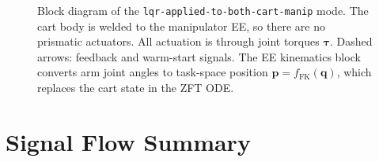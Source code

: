 \documentclass[11pt, a4paper]{article}
\begin{document}
\begin{figure}[H]
{\begin{tikzpicture}
\end{tikzpicture}
}%
\caption{%
  Block diagram of the \texttt{lqr-applied-to-both-cart-manip} mode.
  The cart body is welded to the manipulator EE, so there are no prismatic
  actuators.  All actuation is through joint torques $\bm{\tau}$.
  Dashed arrows: feedback and warm-start signals.
  The EE kinematics block converts arm joint angles to task-space position
  $\bm{p} = f_{\mathrm{FK}}(\bm{q})$, which replaces the cart state in the
  ZFT ODE.}
\label{fig:block_both}
\end{figure}

\section{Signal Flow Summary}
\end{document}
